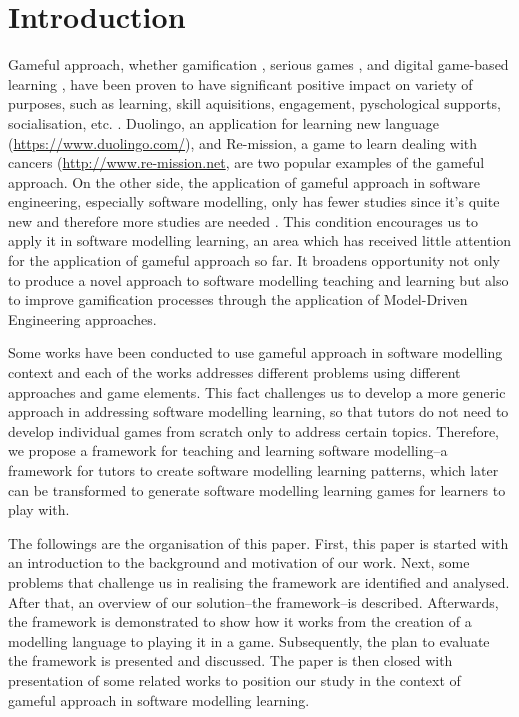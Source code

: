 \documentclass[conference]{IEEEtran}
\begin{document}
\section{Introduction}
Gameful approach, whether gamification \cite{stieglitz2016gamification}, serious games \cite{dorner2016serious}, and digital game-based learning \cite{san2015games}, have been proven to have significant positive impact on variety of purposes, such as learning, skill aquisitions, engagement, pyschological supports, socialisation, etc. \cite{connolly2012systematic, hamari2014does}. Duolingo, an application for learning new language (\url{https://www.duolingo.com/}), and Re-mission, a game to learn dealing with cancers  (\url{http://www.re-mission.net}, are two popular examples of the gameful approach. On the other side, the application of gameful approach in software engineering, especially software modelling, only has fewer studies since it's quite new and therefore more studies are needed \cite{Pedreira2015}. This condition encourages us to apply it in software modelling learning, an area which has received little attention for the application of gameful approach so far. It broadens opportunity not only to produce a novel approach to software modelling teaching and learning but also to improve gamification processes through the application of Model-Driven Engineering approaches. 

Some works \cite{Stikkolorum2014, Groenewegen2010, Ionita2015, Richardsen2014} have been conducted to use gameful approach in software modelling context and each of the works addresses different problems using different approaches and game elements. This fact challenges us to develop a more generic approach in addressing software modelling learning, so that tutors do not need to develop individual games from scratch only to address certain topics. Therefore, we propose a framework for teaching and learning software modelling--a framework for tutors to create software modelling learning patterns, which later can be transformed to generate software modelling learning games for learners to play with.

The followings are the organisation of this paper. First, this paper is started with an introduction to the background and motivation of our work. Next, some problems that challenge us in realising the framework are identified and analysed. After that, an overview of our solution--the framework--is described. Afterwards, the framework is demonstrated to show how it works from the creation of a modelling language to playing it in a game. Subsequently, the plan to evaluate the framework is presented and discussed. The paper is then closed with presentation of some related works to position our study in the context of gameful approach in software modelling learning. 
\end{document}
